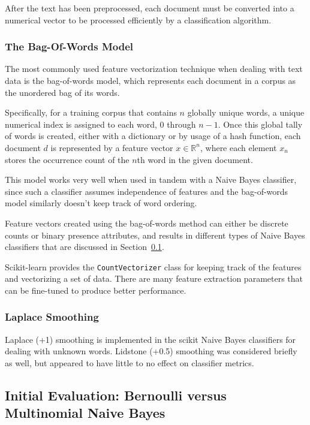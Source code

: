 \documentclass[letter,12pt]{article}
\begin{document}
After the text has been preprocessed, each document must be converted into a
numerical vector to be processed efficiently by a classification algorithm.

\subsubsection{The Bag-Of-Words Model}
\label{ssub:the_bag_of_words_model}

The most commonly used feature vectorization technique when dealing with text
data is the bag-of-words model, which represents each document in a corpus as
the unordered bag of its words.

Specifically, for a training corpus that contains
$n$ globally unique words, a unique numerical index is assigned to each word, 0
through $n - 1$. Once this global tally of words is created, either with a
dictionary or by usage of a hash function, each document $d$ is represented by
a feature vector $x \in \mathbb{R}^n$, where each element $x_n$ stores the
occurrence count of the $n$th word in the given document.

This model works very well when used in tandem with a Naive Bayes classifier,
since such a classifier assumes independence of features and the bag-of-words
model similarly doesn't keep track of word ordering.

Feature vectors created using the bag-of-words method can either be discrete
counts or binary presence attributes, and results in different types of Naive
Bayes classifiers that are discussed in Section~\ref{sub:initial_evaluation}.

Scikit-learn provides the \texttt{CountVectorizer} class for keeping track of
the features and vectorizing a set of data. There are many feature extraction
parameters that can be fine-tuned to produce better performance.

\subsubsection{Laplace Smoothing}
\label{ssub:laplace_smoothing}

Laplace (+1) smoothing is implemented in the scikit Naive Bayes classifiers for
dealing with unknown words. Lidstone (+0.5) smoothing was considered briefly as
well, but appeared to have little to no effect on classifier metrics.

\subsection{Initial Evaluation: Bernoulli versus Multinomial Naive Bayes}
\label{sub:initial_evaluation}
\end{document}
